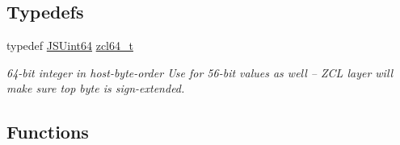 \subsection*{Typedefs}
\begin{DoxyCompactItemize}
\item 
typedef \hyperlink{struct_j_s_int64}{J\+S\+Uint64} \hyperlink{group__zcl__64_ga2e906cb47fc172ae60da5178075dd3c7}{zcl64\+\_\+t}
\begin{DoxyCompactList}\small\item\em 64-\/bit integer in host-\/byte-\/order Use for 56-\/bit values as well -- Z\+CL layer will make sure top byte is sign-\/extended. \end{DoxyCompactList}\end{DoxyCompactItemize}
\subsection*{Functions}
